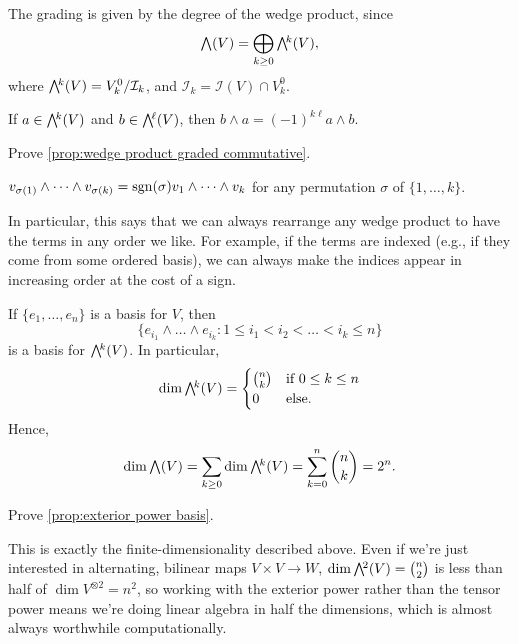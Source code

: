 The grading is given by the degree of the wedge product, since
\[
	\ext{}(V) = \bigoplus_{k \geq 0} \ext{k}(V),
\]
where $\ext{k}(V) = V_k^0/\mathcal{I}_k$, and $\mathcal{I}_k = \mathcal{I}(V) \cap V_k^0$.

\begin{proposition}\label{prop:wedge product graded commutative}
	If $a \in \ext{k}(V)$ and $b \in \ext{\ell}(V)$, then $b \wedge a = (-1)^{k\ell} a \wedge b$.
\end{proposition}

\begin{exercise}
	Prove \cref{prop:wedge product graded commutative}.
\end{exercise}

\begin{corollary}\label{cor:wedge product alternating}
	$v_{\sigma(1)} \wedge \dots \wedge v_{\sigma(k)} = \operatorname{sgn}(\sigma) v_1 \wedge \dots \wedge v_k$ for any permutation $\sigma$ of $\{1,\dots, k\}$.
\end{corollary}

In particular, this says that we can always rearrange any wedge product to have the terms in any order we like. For example, if the terms are indexed (e.g., if they come from some ordered basis), we can always make the indices appear in increasing order at the cost of a sign.

\begin{proposition}\label{prop:exterior power basis}
	If $\{e_1, \dots, e_n\}$ is a basis for $V$, then 
	\[
		\{e_{i_1} \wedge \dots \wedge e_{i_k} : 1 \leq i_1 < i_2 < \dots < i_k \leq n\}
	\]
	is a basis for $\ext{k}(V)$. In particular,
	\[
		\dim \ext{k}(V) = \begin{cases} \binom{n}{k} & \text{if } 0 \leq k \leq n \\ 0 & \text{else.}\end{cases}
	\]
	Hence,
	\[
		\dim \ext{}(V) = \sum_{k \geq 0} \dim \ext{k}(V) = \sum_{k=0}^n \binom{n}{k} = 2^n.
	\]	
\end{proposition}

\begin{exercise}
	Prove \cref{prop:exterior power basis}.
\end{exercise}

This is exactly the finite-dimensionality described above. Even if we're just interested in alternating, bilinear maps $V \times V \to W$, $\dim \ext{2}(V) = \binom{n}{2}$ is less than half of $\dim V^{\otimes 2} = n^2$, so working with the exterior power rather than the tensor power means we're doing linear algebra in half the dimensions, which is almost always worthwhile computationally.

